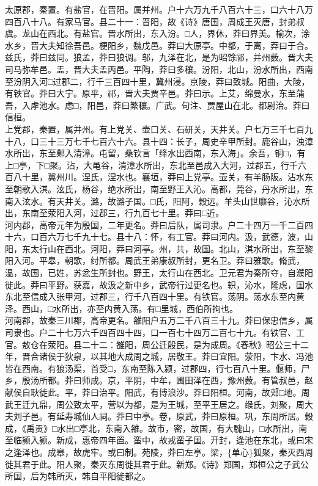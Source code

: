 \documentclass[]{article}
\begin{document}
太原郡，秦置。有盐官，在晋阳。属并州。户十六万九千八百六十三，口六十八万四百八十八。有家马官。县二十一：晋阳，故《诗》唐国，周成王灭唐，封弟叔虞。龙山在西北。有盐官。晋水所出，东入汾。□人，界休，莽曰界美。榆次，涂水乡，晋大夫知徐吾邑。梗阳乡，魏戊邑。莽曰大原亭。中都，于离，莽曰于合。兹氏，莽曰兹同。狼孟，莽曰狼调。邬，九泽在北，是为昭馀祁，并州薮。晋大夫司马弥牟邑。盂，晋大夫孟丙邑。平陶，莽曰多穰。汾阳，北山，汾水所出，西南至汾阴入河□过郡二，行千三百四十里，冀州浸。京陵，莽曰致城。阳曲，大陵，有铁官。莽曰大宁。原平，祁，晋大夫贾辛邑。莽曰示。上艾，绵曼水，东至蒲吾，入虖池水。虑□，阳邑，莽曰繁穰。广武。句注、贾屋山在北。都尉治。莽曰信桓。\\
上党郡，秦置，属并州。有上党关、壶口关、石研关，天井关。户七万三千七百九十八，口三十三万七千七百六十六。县十四：长子，周史辛甲所封。鹿谷山，浊漳水所出，东至鄴入清漳。屯留，桑钦言「绛水出西南，东入海」。余吾，铜□，有上□亭，下□聚。沾，大黾谷，清漳水所出，东北至邑成入大河，过郡五，行千六百八十里，冀州川。涅氏，涅水也。襄垣，莽曰上党亭。壶关，有羊肠阪。沾水东至朝歌入淇。泫氏，杨谷，绝水所出，南至野王入沁。高都，莞谷，丹水所出，东南入泫水。有天井关。潞，故潞子国。□氏，阳阿，穀远。羊头山世靡谷，沁水所出，东南至荥阳入河，过郡三，行九百七十里。莽曰□近。\\
河内郡，高帝元年为殷国，二年更名。莽曰后队，属司隶。户二十四万一千二百四十六，口百六万七千九十七。县十八：怀，有工官。莽曰河内。汲，武德，波，山阳，东太行山在西北。河阳，莽曰河亭。州，共，故国。北山，淇水所出，东至黎阳入河。平皋，朝歌，纣所都。周武王弟康叔所封，更名卫。莽曰雅歌。脩武，温，故国，已姓，苏忿生所封也。野王，太行山在西北。卫元君为秦所夺，自濮阳徙此。莽曰平野。获嘉，故汲之新中乡，武帝行过更名也。轵，沁水，隆虑，国水东北至信成入张甲河，过郡三，行千八百四十里。有铁官。荡阴。荡水东至内黄泽。西山，□水所出，亦至内黄入荡。有□里城，西伯所拘也。\\
河南郡，故秦三川郡，高帝更名。雒阳户五万二千八百三十九。莽曰保忠信乡，属司隶也。户二十七万六千四百四十四，口一百七十四万二百七十九。有铁官、工官。敖仓在荥阳。县二十二：雒阳，周公迁殷民，是为成周。《春秋》昭公三十二年，晋合诸侯于狄泉，以其地大成周之城，居敬王。莽曰宜阳。荥阳，卞水、冯池皆在西南。有狼汤渠，首受□，东南至陈入颍，过郡四，行七百八十里。偃师，尸乡，殷汤所都。莽曰师成。京，平阴，中牟，圃田泽在西，豫州薮。有管叔邑，赵献侯自耿徙此。平，莽曰治平。阳武，有博浪沙。莽曰阳桓。河南，故郏□地。周武王迁九鼎，周公致太平，营以为都，是为王城，至平王居之。缑氏，刘聚，周大夫刘子邑。有延寿城仙人祠。莽曰中亭。卷，原武，莽曰原桓。巩，东周所居。穀成，《禹贡》□水出□亭北，东南入雒。故市，密，故国，有大騩山，□水所出，南至临颍入颍。新成，惠帝四年置。蛮中，故戎蛮子国。开封，逢池在东北，或曰宋之逢泽也。成皋，故虎牢。或曰制。苑陵，莽曰左亭。梁，\{单心\}狐聚，秦灭西周徙其君于此。阳人聚，秦灭东周徙其君于此。新郑。《诗》郑国，郑桓公之子武公所国，后为韩所灭，韩自平阳徙都之。\\
\end{document}
